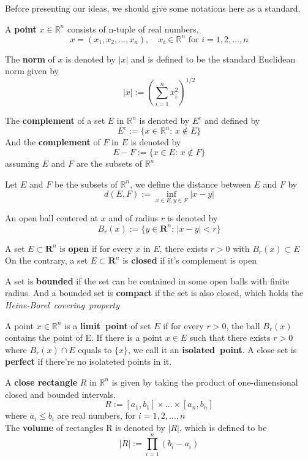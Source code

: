 \documentclass{ctexbook}
\begin{document}
Before presenting our ideas, we should give some notations here as a standard.
\begin{define}[point]
    A \textbf{point} $x \in \mathbb{R}^n$ consists of n-tuple of real numbers,
    \[x=(x_1,x_2,\ldots,x_n),\quad x_i \in \mathbb{R}^n \text{ for } i=1,2,\ldots,n\]
\end{define}
\begin{define}[norm]
    The \textbf{norm} of $x$ is denoted by $\left|x\right|$ and is defined to be the standard Euclidean norm given by 
    \[\left|x\right|:=(\sum\limits^n_{i=1}x_i^2)^{1/2}\]
\end{define}
\begin{define}[complement]
    The \textbf{complement} of a set $E$ in $\mathbb{R}^n$ is denoted by $E^c$ and defined by 
    \[E^c:=\{x\in \mathbb{R}^n:\, x \notin E\}\]
    And the \textbf{complement} of $F$ in $E$ is denoted by 
    \[E-F:=\{x \in E:\, x \notin F\}\]
    assuming $E$ and $F$ are the subsets of $\mathbb{R}^n$
\end{define}
\begin{define}
    Let $E$ and $F$ be the subsets of $\mathbb{R}^n$, we define the distance between $E$ and $F$ by 
    \[d(E,F):=\inf\limits_{x\in E, y\in F}\left|x-y\right|\] 
\end{define}
\begin{define}
    An open ball centered at $x$ and of radius $r$ is denoted by 
    \[B_r(x):=\{y\in \mathbf{R}^n:\, \left|x-y\right|<r\}\]
\end{define}
\begin{define}
    A set $E \subset \mathbf{R}^n$ is \textbf{open} if for every $x$ in $E$, there exists $r>0$ with $B_r(x) \subset E$
    On the contrary, a set $E \subset \mathbf{R}^n$ is \textbf{closed} if it's complement is open
\end{define}
\begin{define}
    A set is \textbf{bounded} if the set can be contained in some open balls with finite radius.
    And a bounded set is \textbf{compact} if the set is also closed, which holds the \textit{Heine-Borel~covering~property} 
\end{define}
\begin{define}
    A point $x\in \mathbb{R}^n$ is a \textbf{limit~point} of set $E$ if for every $r>0$, the ball $B_r(x)$ contains the point of
    E.
    If there is a point $x \in E$ such that there exists $r>0$ where $B_r(x)\cap E$ equals to $\{x\}$, we call it an \textbf{isolated~point}.
    A close set is \textbf{perfect} if there're no isolateted points in it.  
\end{define}
\begin{define}[rectangles]
    A \textbf{close rectangle} $R$ in $\mathbb{R}^n$ is given by taking the product of one-dimensional closed and bounded intervals.
    \[R:=[a_1,b_1]\times\ldots\times[a_n,b_n]\]
    where $a_i\leq b_i$ are real numbers, for $i=1,2,\ldots,n$\\
    The \textbf{volume} of rectangles R is denoted by $\left|R\right|$, which is defined to be 
    \[\left|R\right|:=\prod\limits_{i=1}^n(b_i-a_i)\]
\end{define}
\end{document}
